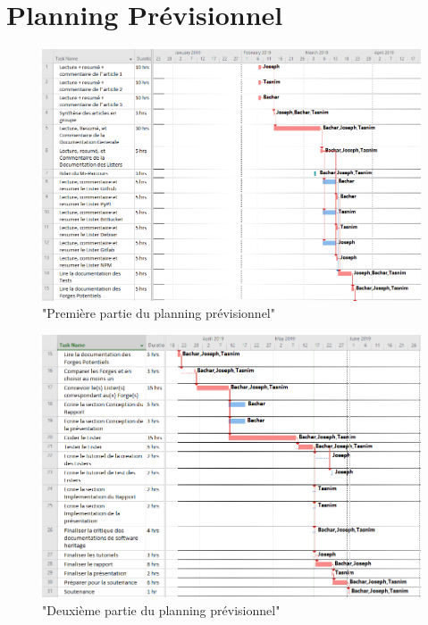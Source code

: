 \documentclass[12pt,a4paper]{report}
\begin{document}
\chapter{Planning Prévisionnel}
\begin{figure}[!ht]
  	\hspace*{-2cm}   
	\includegraphics[scale=0.72]{"images/gantt1"}
	\caption{"Première partie du planning prévisionnel"}
\end{figure}

\begin{figure}[!ht]
  	\hspace*{-2cm}   
	\includegraphics[scale=0.78]{"images/gantt2"}
	\caption{"Deuxième partie du planning prévisionnel"}
\end{figure}
\end{document}
